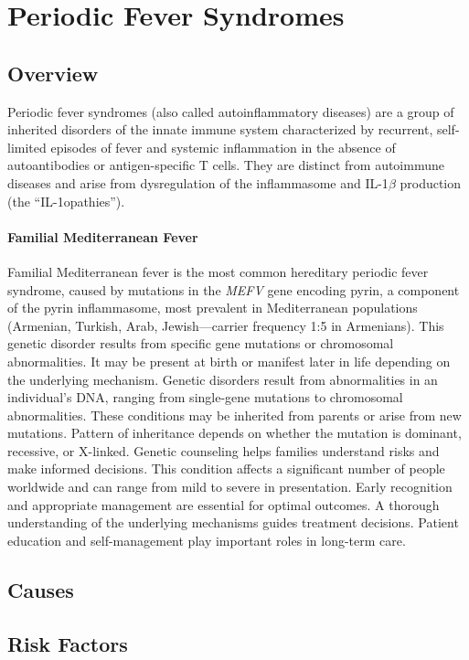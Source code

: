 \chapter{Periodic Fever Syndromes}
\label{sec:Periodic Fever Syndromes}

\section{Overview}
Periodic fever syndromes (also called autoinflammatory diseases) are a group of inherited disorders of the innate immune system characterized by recurrent, self-limited episodes of fever and systemic inflammation in the absence of autoantibodies or antigen-specific T cells. They are distinct from autoimmune diseases and arise from dysregulation of the inflammasome and IL-1$\beta$ production (the ``IL-1opathies'').

\subsubsection{Familial Mediterranean Fever}
Familial Mediterranean fever is the most common hereditary periodic fever syndrome, caused by mutations in the \textit{MEFV} gene encoding pyrin, a component of the pyrin inflammasome, most prevalent in Mediterranean populations (Armenian, Turkish, Arab, Jewish---carrier frequency 1:5 in Armenians). This genetic disorder results from specific gene mutations or chromosomal abnormalities. It may be present at birth or manifest later in life depending on the underlying mechanism. Genetic disorders result from abnormalities in an individual's DNA, ranging from single-gene mutations to chromosomal abnormalities. These conditions may be inherited from parents or arise from new mutations. Pattern of inheritance depends on whether the mutation is dominant, recessive, or X-linked. Genetic counseling helps families understand risks and make informed decisions. This condition affects a significant number of people worldwide and can range from mild to severe in presentation. Early recognition and appropriate management are essential for optimal outcomes. A thorough understanding of the underlying mechanisms guides treatment decisions. Patient education and self-management play important roles in long-term care.
\section{Causes}
\section{Risk Factors}

